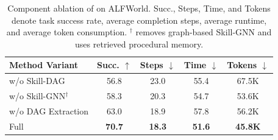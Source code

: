 \begin{table}[htbp]
\centering
\small
\renewcommand{\arraystretch}{1.12}
\setlength{\tabcolsep}{3.8pt}
\begin{tabular}{lcccc}
\toprule
Method Variant & Succ. $\uparrow$ & Steps $\downarrow$ & Time $\downarrow$ & Tokens $\downarrow$ \\
\midrule
w/o Skill-DAG  & 56.8 & 23.0 & 55.4 & 67.5K \\
w/o Skill-GNN$^\dagger$ & 58.3 & 20.3 & 54.7 & 53.6K \\
w/o DAG Extraction & 63.0 & 18.9 & 57.8 & 56.2K \\
Full \model{} & \textbf{70.7} & \textbf{18.3} & \textbf{51.6} & \textbf{45.8K} \\
\bottomrule
\end{tabular}
\caption{Component ablation of \model{} on ALFWorld. Succ., Steps, Time, and Tokens denote task success rate, average completion steps, average runtime, and average token consumption. $^\dagger$ removes graph-based Skill-GNN and uses retrieved procedural memory.}
\label{tab:ablation}
\end{table}